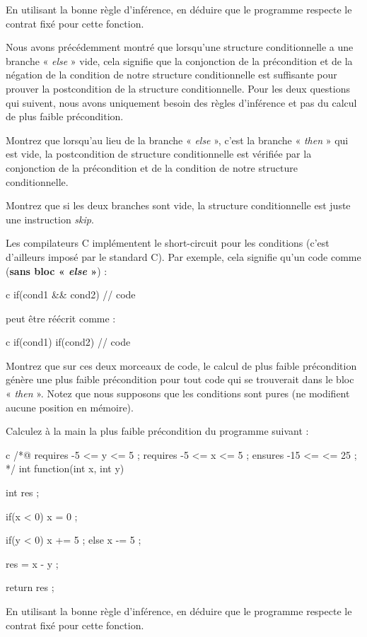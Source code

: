 En utilisant la bonne règle d'inférence, en déduire que le programme respecte le 
contrat fixé pour cette fonction.




Nous avons précédemment montré que lorsqu'une structure conditionnelle a une branche
« \textit{else} » vide, cela signifie que la conjonction de la précondition et de la négation
de la condition de notre structure conditionnelle est suffisante pour prouver la
postcondition de la structure conditionnelle.
Pour les deux questions qui suivent, nous avons uniquement besoin des règles d'inférence
et pas du calcul de plus faible précondition.


Montrez que lorsqu'au lieu de la branche « \textit{else} », c'est la branche « \textit{then} » qui est
vide, la postcondition de structure conditionnelle est vérifiée par la conjonction de
la précondition et de la condition de notre structure conditionnelle.


Montrez que si les deux branches sont vide, la structure conditionnelle est juste une
instruction \textit{skip}.




Les compilateurs C implémentent le short-circuit pour les conditions (c'est d'ailleurs
imposé par le standard C). Par exemple, cela signifie qu'un code comme (\textbf{sans
bloc « \textit{else} »}) :


\begin{CodeBlock}{c}
if(cond1 && cond2){
  // code
}
\end{CodeBlock}


peut être réécrit comme :


\begin{CodeBlock}{c}
if(cond1){
  if(cond2){    
    // code
  }
}
\end{CodeBlock}


Montrez que sur ces deux morceaux de code, le calcul de plus faible précondition
génère une plus faible précondition pour tout code qui se trouverait dans le bloc
« \textit{then} ». Notez que nous supposons que les conditions sont pures (ne modifient aucune
position en mémoire).





Calculez à la main la plus faible précondition du programme suivant :


\begin{CodeBlock}{c}
/*@ 
  requires -5 <= y <= 5 ; 
  requires -5 <= x <= 5 ; 
  ensures  -15 <= \result <= 25 ;
*/
int function(int x, int y){
  int res ;

  if(x < 0){
    x = 0 ;
  }
  
  if(y < 0){
    x += 5 ;
  } else {
    x -= 5 ;
  }
  
  res = x - y ;

  return res ;
}
\end{CodeBlock}



En utilisant la bonne règle d'inférence, en déduire que le programme respecte le 
contrat fixé pour cette fonction.
